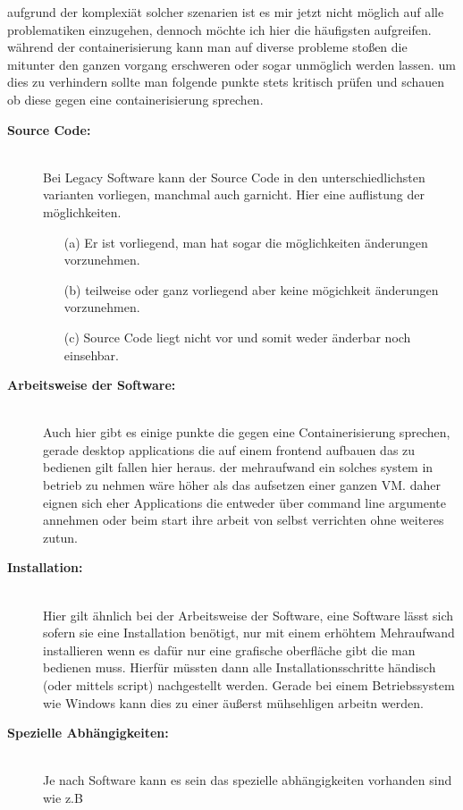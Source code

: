 aufgrund der komplexiät solcher szenarien ist es mir jetzt nicht möglich auf alle problematiken einzugehen, dennoch möchte ich hier die häufigsten aufgreifen.
während der containerisierung kann man auf diverse probleme stoßen die mitunter den ganzen vorgang erschweren oder sogar unmöglich werden lassen. um dies zu verhindern sollte
man folgende punkte stets kritisch prüfen und schauen ob diese gegen eine containerisierung sprechen.

\begin{description}
	\item[\textbf{Source Code:}]\hfill \\ Bei Legacy Software kann der Source Code in den unterschiedlichsten varianten vorliegen, manchmal auch garnicht. Hier eine auflistung der möglichkeiten. \\
	\begin{itemize}
		\item[(a)] Er ist vorliegend, man hat sogar die möglichkeiten änderungen vorzunehmen. \\
		\item[(b)] teilweise oder ganz vorliegend aber keine mögichkeit änderungen vorzunehmen. \\
		\item[(c)] Source Code liegt nicht vor und somit weder änderbar noch einsehbar. \\
	\end{itemize}
	\item[\textbf{Arbeitsweise der Software:}]\hfill \\ Auch hier gibt es einige punkte die gegen eine Containerisierung sprechen, gerade desktop applications die auf einem frontend aufbauen das zu bedienen gilt fallen hier heraus. der mehraufwand ein solches system in betrieb zu nehmen wäre höher als das aufsetzen einer ganzen VM. daher eignen sich eher Applications die entweder über command line argumente annehmen oder beim start ihre arbeit von selbst verrichten ohne weiteres zutun. \\
	\item[\textbf{Installation:}]\hfill \\ Hier gilt ähnlich bei der Arbeitsweise der Software, eine Software lässt sich sofern sie eine Installation benötigt, nur mit einem erhöhtem Mehraufwand installieren wenn es dafür nur eine grafische oberfläche gibt die man bedienen muss. Hierfür müssten dann alle Installationsschritte händisch (oder mittels script) nachgestellt werden. Gerade bei einem Betriebssystem wie Windows kann dies zu einer äußerst mühsehligen arbeitn werden.\\
	\item[\textbf{Spezielle Abhängigkeiten:}]\hfill \\ Je nach Software kann es sein das spezielle abhängigkeiten vorhanden sind wie z.B \\


\end{description}
